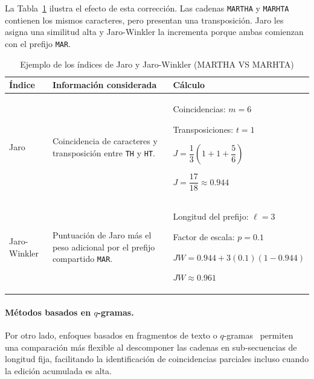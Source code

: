 La Tabla~\ref{tab:ejemplo_jaro_winkler} ilustra el efecto de esta corrección. Las cadenas \texttt{MARTHA} y \texttt{MARHTA} contienen los mismos caracteres, pero presentan una transposición. Jaro les asigna una similitud alta y Jaro-Winkler la incrementa porque ambas comienzan con el prefijo \texttt{MAR}.

\begin{table}[H]
\centering
\caption{Ejemplo de los índices de Jaro y Jaro-Winkler (MARTHA VS MARHTA)}
\label{tab:ejemplo_jaro_winkler}
\small
\begin{tabular}{>{\raggedright\arraybackslash}p{2.7cm}
                >{\raggedright\arraybackslash}p{5.6cm}
                >{\raggedright\arraybackslash}p{5.0cm}}
\toprule
\textbf{Índice} & \textbf{Información considerada} & \textbf{Cálculo} \\
\midrule
Jaro
  & Coincidencia de caracteres y transposición entre \texttt{TH} y \texttt{HT}.
  & Coincidencias: $m=6$

    Transposiciones: $t=1$

    \vspace{2pt}
    $J=\dfrac{1}{3}\left(1+1+\dfrac{5}{6}\right)$

    \vspace{2pt}
    $J=\dfrac{17}{18}\approx0.944$ \\
\addlinespace
Jaro-Winkler
  & Puntuación de Jaro más el peso adicional por el prefijo compartido \texttt{MAR}.
  & Longitud del prefijo: $\ell=3$

    Factor de escala: $p=0.1$

    \vspace{2pt}
    $JW=0.944+3(0.1)(1-0.944)$

    \vspace{2pt}
    $JW\approx0.961$ \\
\bottomrule
\end{tabular}
\end{table}

\paragraph{Métodos basados en $q$-gramas.}
Por otro lado, enfoques basados en fragmentos de texto o $q$-gramas~\cite{ukkonen1992} permiten una comparación más flexible al descomponer las cadenas en sub-secuencias de longitud fija, facilitando la identificación de coincidencias parciales incluso cuando la edición acumulada es alta.

